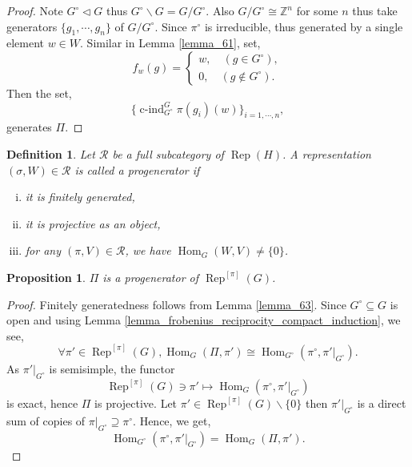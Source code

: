 \documentclass[8pt]{article}
\newtheorem{proposition}{Proposition}[section]
\newtheorem{definition}{Definition}[section]
\DeclareMathOperator{\cind}{c-ind}
\DeclareMathOperator{\Rep}{Rep}
\DeclareMathOperator{\Hom}{Hom}
\newcommand{\Z}[0]{\mathbb{Z}}
\begin{document}
\begin{proof}
  Note $G^\circ\triangleleft G$ thus $G^\circ\backslash G = G/G^\circ$. Also $G/G^\circ\cong \Z^n$ for some $n$ thus take generators $\{g_1,\cdots,g_n\}$ of $G/G^\circ$. Since $\pi^\circ$ is irreducible, thus generated by a single element $w\in W$. Similar in Lemma \ref{lemma_61}, set,
  \begin{equation*}
    f_w(g) = \begin{cases}
      w,\quad(g\in G^\circ),\\
      0,\quad(g\not\in G^\circ).
    \end{cases}
  \end{equation*}
  Then the set,
  \begin{equation*}
    \{\cind_{G^\circ}^G\pi(g_i)(w)\}_{i=1,\cdots,n},
  \end{equation*}
  generates $\Pi$.
\end{proof}
\begin{definition}
  Let $\mathscr{R}$ be a full subcategory of $\Rep(H)$. A representation $(\sigma,W)\in\mathscr{R}$ is called a progenerator if 
  \begin{enumerate}[i).]
    \item it is finitely generated,
    \item it is projective as an object,
    \item for any $(\pi,V)\in\mathscr{R}$, we have $\Hom_G(W,V)\not=\{0\}$.
  \end{enumerate}
\end{definition}
\begin{proposition}
  \label{proposition_64}
  $\Pi$ is a progenerator of $\Rep^{[\pi]}(G)$. 
\end{proposition}
\begin{proof}
  Finitely generatedness follows from Lemma \ref{lemma_63}. Since $G^\circ\subseteq G$ is open and using Lemma \ref{lemma_frobenius_reciprocity_compact_induction}, we see,
  \begin{equation*}
    \forall\pi'\in\Rep^{[\pi]}(G), \Hom_G(\Pi,\pi')\cong\Hom_{G^\circ}(\pi^\circ,\pi'|_{G^\circ}).
  \end{equation*}
  As $\pi'|_{G^\circ}$ is semisimple, the functor 
  \begin{equation*}
    \Rep^{[\pi]}(G)\ni\pi'\mapsto \Hom_G(\pi^\circ,\pi'|_{G^\circ})
  \end{equation*}
  is exact, hence $\Pi$ is projective. Let $\pi'\in\Rep^{[\pi]}(G)\backslash\{0\}$ then $\pi'|_{G^\circ}$ is a direct sum of copies of $\pi|_{G^\circ}\supseteq\pi^\circ$. Hence, we get,
  \begin{equation*}
    \Hom_{G^\circ}(\pi^\circ,\pi'|_{G^\circ}) = \Hom_G(\Pi,\pi').
  \end{equation*}
\end{proof}
\end{document}
